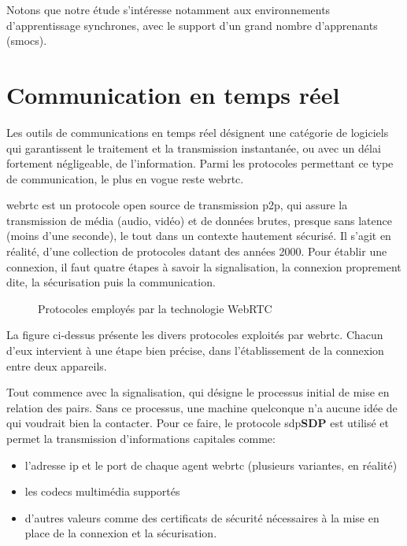 Notons que notre étude s'intéresse notamment aux environnements d’apprentissage synchrones, 
avec le support d’un grand nombre d’apprenants (\acrshort{smoc}s).

\section{Communication en temps réel}
Les outils de communications en temps réel désignent une catégorie de logiciels qui garantissent le traitement et la transmission instantanée, 
ou avec un délai fortement négligeable,  de l’information. 
Parmi les protocoles permettant ce type de communication, le plus en vogue reste \acrfull{webrtc}.


\acrshort{webrtc} est un protocole open source de transmission \gls{p2p}, qui assure la transmission de média (audio, vidéo) 
et de données brutes, presque sans latence (moins d’une seconde), 
le tout dans un contexte hautement sécurisé. 
Il s’agit en réalité, d’une collection de protocoles datant des années 2000. 
Pour établir une connexion, il faut quatre étapes à savoir la signalisation, la connexion proprement dite, la sécurisation puis la communication.

\begin{figure}[H]
  \centering
  \caption{Protocoles employés par la technologie WebRTC}
  \label{fig:webrtc_protocols}
\end{figure}

La figure ci-dessus présente les divers protocoles exploités par \acrshort{webrtc}.  Chacun d'eux intervient
à une étape bien précise, dans l'établissement de la connexion entre deux appareils.


Tout commence avec la signalisation, qui désigne le processus initial de mise en relation des pairs. 
Sans ce processus, une machine quelconque n’a aucune idée de qui voudrait bien la contacter. 
Pour ce faire, le protocole \acrshort{sdp}\textbf{SDP} est utilisé et permet la transmission d’informations capitales comme:

\begin{itemize}
  \item l’adresse \acrshort{ip} et le port de chaque agent \acrshort{webrtc} (plusieurs variantes, en réalité)
  \item les codecs multimédia supportés
  \item d’autres valeurs comme des certificats de sécurité nécessaires à la mise en place de la connexion et la sécurisation.
\end{itemize}


